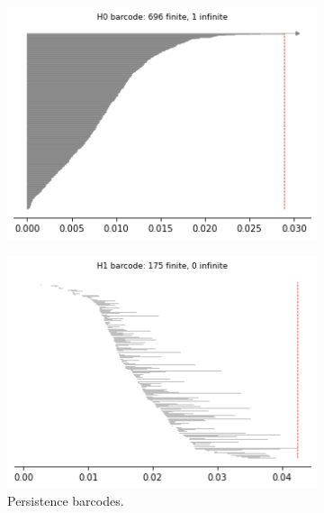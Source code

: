 \begin{figure}[H]
\begin{subfigure}[b]{0.25\textwidth}
\end{subfigure}
\begin{subfigure}[b]{0.24\textwidth}
    \includegraphics[width=\textwidth]{figures/X3_H0_barcode.png}
    \caption{}
\end{subfigure}
\begin{subfigure}[b]{0.24\textwidth}
    \includegraphics[width=\textwidth]{figures/X3_H1_barcode.png}
        \caption{Persistence barcodes.}
\end{subfigure}
\begin{subfigure}[b]{0.24\textwidth}

\end{subfigure}
\end{figure}
